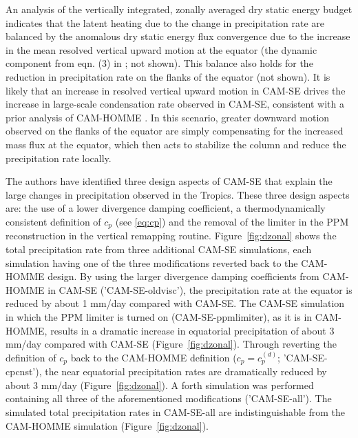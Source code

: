 An analysis of the vertically integrated, zonally averaged dry static energy budget indicates that the latent heating due to the change in precipitation rate are balanced by the anomalous dry static energy flux convergence due to the increase in the mean resolved vertical upward motion at the equator (the dynamic component from eqn. (3) in \cite{MO2011NATUREC}; not shown). This balance also holds for the reduction in precipitation rate on the flanks of the equator (not shown). It is likely that an increase in resolved vertical upward motion in CAM-SE drives the increase in large-scale condensation rate observed in CAM-SE, consistent with a prior analysis of CAM-HOMME \citep{OETAL2016JAMES}. In this scenario, greater downward motion observed on the flanks of the equator are simply compensating for the increased mass flux at the equator, which then acts to stabilize the column and reduce the precipitation rate locally.

The authors have identified three design aspects of CAM-SE that explain the large changes in precipitation observed in the Tropics. These three design aspects are: the use of a lower divergence damping coefficient, a thermodynamically consistent definition of $c_p$ (see \eqref{eq:cp}) and the removal of the limiter in the PPM reconstruction in the vertical remapping routine. Figure~\ref{fig:dzonal} shows the total precipitation rate from three additional CAM-SE simulations, each simulation having one of the three modifications reverted back to the CAM-HOMME design. By using the larger divergence damping coefficients from CAM-HOMME in CAM-SE ('CAM-SE-oldvisc'), the precipitation rate at the equator is reduced by about 1 mm/day compared with CAM-SE. The CAM-SE simulation in which the PPM limiter is turned on (CAM-SE-ppmlimiter), as it is in CAM-HOMME, results in a dramatic increase in equatorial precipitation of about 3 mm/day compared with CAM-SE (Figure~\ref{fig:dzonal}). Through reverting the definition of $c_p$ back to the CAM-HOMME definition ($c_p = c_p^{(d)}$; 'CAM-SE-cpcnst'), the near equatorial precipitation rates are dramatically reduced by about 3 mm/day (Figure~\ref{fig:dzonal}). A forth simulation was performed containing all three of the aforementioned modifications ('CAM-SE-all'). The simulated total precipitation rates in CAM-SE-all are indistinguishable from the CAM-HOMME simulation (Figure~\ref{fig:dzonal}).  

